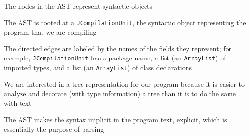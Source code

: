 \documentclass[8pt,a4paper,compress,handout]{beamer}
\begin{document}
\begin{frame}[fragile]
\pause

AST for the \lstinline{Factorial} program
\begin{center}
}
\end{center}
\end{frame}

\begin{frame}[fragile]
\pause

The nodes in the AST represent syntactic objects

\pause
\bigskip

The AST is rooted at a \lstinline{JCompilationUnit}, the syntactic object representing the program that we are compiling

\pause
\bigskip

The directed edges are labeled by the names of the fields they represent; for example, \lstinline{JCompilationUnit} has a package name, a list (an \lstinline{ArrayList}) of imported types, and a list (an \lstinline{ArrayList}) of class declarations

\pause
\bigskip

We are interested in a tree representation for our program because it is easier to analyze and decorate (with type information) a tree than it is to do the same with text

\pause
\bigskip

The AST makes the syntax implicit in the program text, explicit, which is essentially the purpose of parsing
\end{frame}
\end{document}
